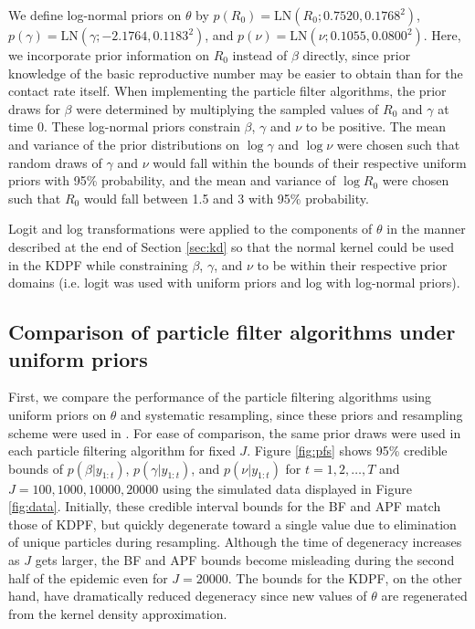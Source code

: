 \documentclass{elsarticle}
\begin{document}
We define log-normal priors on $\theta$ by \hbox{$p(R_0) = \mbox{LN}(R_0; 0.7520, 0.1768^2)$}, \hbox{$p(\gamma) = \mbox{LN}(\gamma; -2.1764, 0.1183^2)$}, and \hbox{$p(\nu) = \mbox{LN}(\nu; 0.1055, 0.0800^2)$}. Here, we incorporate prior information on $R_0$ instead of $\beta$ directly, since prior knowledge of the basic reproductive number may be easier to obtain than for the contact rate itself. When implementing the particle filter algorithms, the prior draws for $\beta$ were determined by multiplying the sampled values of $R_0$ and $\gamma$ at time 0. These log-normal priors constrain $\beta$, $\gamma$ and $\nu$ to be positive. The mean and variance of the prior distributions on $\log \gamma$ and $\log \nu$ were chosen such that random draws of $\gamma$ and $\nu$ would fall within the bounds of their respective uniform priors with 95\% probability, and the mean and variance of $\log R_0$ were chosen such that $R_0$ would fall between 1.5 and 3 with 95\% probability.

Logit and log transformations were applied to the components of $\theta$ in the manner described at the end of Section \ref{sec:kd} so that the normal kernel could be used in the KDPF while constraining $\beta$, $\gamma$, and $\nu$ to be within their respective prior domains (i.e. logit was used with uniform priors and log with log-normal priors).

\subsection{Comparison of particle filter algorithms under uniform priors} \label{sec:pfcomparison}

First, we compare the performance of the particle filtering algorithms using uniform priors on $\theta$ and systematic resampling, since these priors and resampling scheme were used in \citet{skvortsov2012monitoring}. For ease of comparison, the same prior draws were used in each particle filtering algorithm for fixed $J$. Figure \ref{fig:pfs} shows 95\% credible bounds of $p(\beta|y_{1:t})$, $p(\gamma|y_{1:t})$, and $p(\nu|y_{1:t})$ for $t = 1,2,\ldots,T$ and $J = 100, 1000, 10000, 20000$ using the simulated data displayed in Figure \ref{fig:data}. Initially, these credible interval bounds for the BF and APF match those of KDPF, but quickly degenerate toward a single value due to elimination of unique particles during resampling. Although the time of degeneracy increases as $J$ gets larger, the BF and APF bounds become misleading during the second half of the epidemic even for $J = 20000$. The bounds for the KDPF, on the other hand, have dramatically reduced degeneracy since new values of $\theta$ are regenerated from the kernel density approximation.
\end{document}
